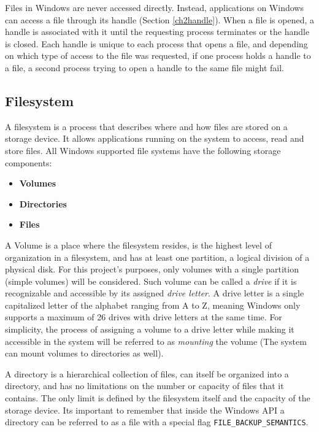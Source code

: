 Files in Windows are never accessed directly. Instead, applications on Windows can access a file through its handle (Section \ref{ch2handle}). When a file is opened, a handle is associated with it until the requesting process terminates or the handle is closed. Each handle is unique to each process that opens a file, and depending on which type of access to the file was requested, if one process holds a handle to a file, a second process trying to open a handle to the same file might fail.\cite{FileHandles}

\subsection*{Filesystem}
A filesystem is a process that describes where and how files are stored on a storage device. It allows applications running on the system to access, read and store files. All Windows supported file systems have the following storage components:\cite{LocalFileSystems}

\begin{itemize}
    \item \textbf{Volumes}
    \item \textbf{Directories}
    \item \textbf{Files}
\end{itemize}

A Volume is a place where the filesystem resides, is the highest level of organization in a filesystem, and has at least one partition, a logical division of a physical disk.\cite{WinVolumeMgmt} For this project's purposes, only volumes with a single partition (simple volumes) will be considered. Such volume can be called a \textit{drive} if it is recognizable and accessible by its assigned \textit{drive letter}. 
A drive letter is a single capitalized letter of the alphabet ranging from A to Z, meaning Windows only supports a maximum of 26 drives with drive letters at the same time. For simplicity, the process of assigning a volume to a drive letter while making it accessible in the system will be referred to as \textit{mounting} the volume (The system can mount volumes to directories as well).

A directory is a hierarchical collection of files, can itself be organized into a directory, and has no limitations on the number or capacity of files that it contains. The only limit is defined by the filesystem itself and the capacity of the storage device.\cite{WinDirectoryMgmt} Its important to remember that inside the Windows API a directory can be referred to as a file with a special flag \lstinline{FILE_BACKUP_SEMANTICS}.

